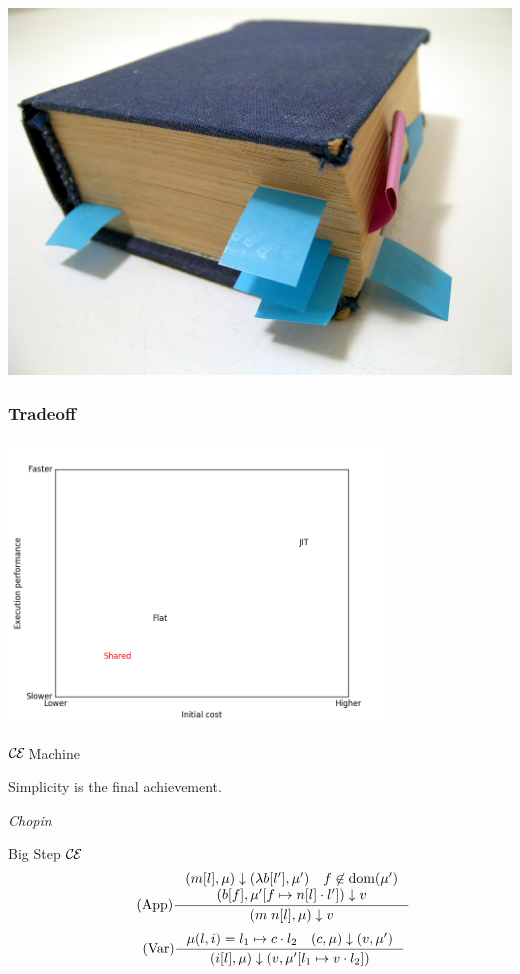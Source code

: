 \documentclass[14pt]{beamer}
\def\ce{$\mathcal{\mathcal{C} \mskip -1mu \mathcal{E}} \mskip 4mu$}
\newcommand{\sectionslide}[3]{
  \begin{frame}
  \vspace{1cm}
  \vfill
  {\usebeamerfont{title} \color{red} #1}
  \vfill
  \epigraph{\footnotesize{#2}}{\footnotesize{\emph{#3}}}
  \end{frame}}
\begin{document}
\begin{frame}
\hspace*{-11.2mm}
\includegraphics[width=\paperwidth]{bookmark}
\end{frame}

\begin{frame}[fragile]
\frametitle{Tradeoff}
\begin{center}
\includegraphics[width=10cm]{tradeoffplot}
\end{center}
\end{frame}

\sectionslide{\ce Machine}
{Simplicity is the final achievement.}
{Chopin}

\begin{frame}{Big Step \ce} 
\begin{align*}
\tag{App} \inference
{(m[l], \mu) \downarrow (\lambda b[l'], \mu') \quad f \not \in \textnormal{dom}(\mu') \\ 
(b[f], \mu'[f \mapsto n[l] \cdot l']) \downarrow v}
{(m \; n[l], \mu) \downarrow v}  
\end{align*}
\begin{align*}
\tag{Var} \inference
{\mu(l, i) = l_1 \mapsto c \cdot l_2 \quad (c, \mu) \downarrow (v, \mu')}
{(i[l],\mu) \downarrow (v, \mu'[l_1 \mapsto v \cdot l_2])}
\end{align*}
\end{frame}
\end{document}
